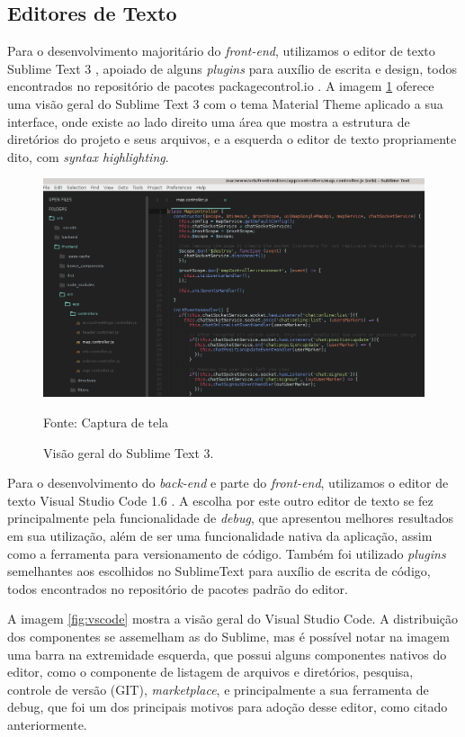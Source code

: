 \subsection{Editores de Texto}
Para o desenvolvimento majoritário do \textit{front-end}, utilizamos o editor de texto Sublime Text 3 \cite{sublime}, apoiado de alguns \textit{plugins} para auxílio de escrita e design, todos encontrados no repositório de pacotes packagecontrol.io \cite{packagecontrolio}. A imagem \ref{fig:sublime3} oferece uma visão geral do Sublime Text 3 com o tema Material Theme aplicado a sua interface, onde existe ao lado direito uma área que mostra a estrutura de diretórios do projeto e seus arquivos, e a esquerda o editor de texto propriamente dito, com \textit{syntax highlighting}.

\begin{figure}[H]
	\centering
	\includegraphics[scale=0.51]{imagens/sublime3.png}
	\caption{\small Visão geral do Sublime Text 3.} Fonte: Captura de tela
	\label{fig:sublime3}
\end{figure}

Para o desenvolvimento do \textit{back-end} e parte do \textit{front-end}, utilizamos o editor de texto Visual Studio Code 1.6 \cite{vscode}. A escolha por este outro editor de texto se fez principalmente pela funcionalidade de \textit{debug}, que apresentou melhores resultados em sua utilização, além de ser uma funcionalidade nativa da aplicação, assim como a ferramenta para versionamento de código. Também foi utilizado \textit{plugins} semelhantes aos escolhidos no SublimeText para auxílio de escrita de código, todos encontrados no repositório de pacotes padrão do editor.

A imagem \ref{fig:vscode} mostra a visão geral do Visual Studio Code. A distribuição dos componentes se assemelham as do Sublime, mas é possível notar na imagem uma barra na extremidade esquerda, que possui alguns componentes nativos do editor, como o componente de listagem de arquivos e diretórios, pesquisa, controle de versão (GIT), \textit{marketplace}, e principalmente a sua ferramenta de debug, que foi um dos principais motivos para adoção desse editor, como citado anteriormente.

